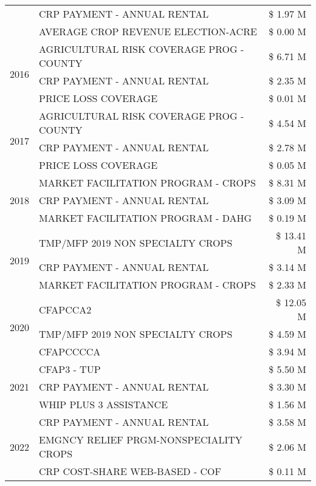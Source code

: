 \begin{tabular}{llr}
 & CRP PAYMENT - ANNUAL RENTAL & \$ 1.97 M \\
 & AVERAGE CROP REVENUE ELECTION-ACRE & \$ 0.00 M \\
\cline{1-3}
\multirow[t]{3}{*}{2016} & AGRICULTURAL RISK COVERAGE PROG - COUNTY & \$ 6.71 M \\
 & CRP PAYMENT - ANNUAL RENTAL & \$ 2.35 M \\
 & PRICE LOSS COVERAGE & \$ 0.01 M \\
\cline{1-3}
\multirow[t]{3}{*}{2017} & AGRICULTURAL RISK COVERAGE PROG - COUNTY & \$ 4.54 M \\
 & CRP PAYMENT - ANNUAL RENTAL & \$ 2.78 M \\
 & PRICE LOSS COVERAGE & \$ 0.05 M \\
\cline{1-3}
\multirow[t]{3}{*}{2018} & MARKET FACILITATION PROGRAM - CROPS & \$ 8.31 M \\
 & CRP PAYMENT - ANNUAL RENTAL & \$ 3.09 M \\
 & MARKET FACILITATION PROGRAM - DAHG & \$ 0.19 M \\
\cline{1-3}
\multirow[t]{3}{*}{2019} & TMP/MFP 2019 NON SPECIALTY CROPS & \$ 13.41 M \\
 & CRP PAYMENT - ANNUAL RENTAL & \$ 3.14 M \\
 & MARKET FACILITATION PROGRAM - CROPS & \$ 2.33 M \\
\cline{1-3}
\multirow[t]{3}{*}{2020} & CFAPCCA2 & \$ 12.05 M \\
 & TMP/MFP 2019 NON SPECIALTY CROPS & \$ 4.59 M \\
 & CFAPCCCCA & \$ 3.94 M \\
\cline{1-3}
\multirow[t]{3}{*}{2021} & CFAP3 - TUP & \$ 5.50 M \\
 & CRP PAYMENT - ANNUAL RENTAL & \$ 3.30 M \\
 & WHIP PLUS 3 ASSISTANCE & \$ 1.56 M \\
\cline{1-3}
\multirow[t]{3}{*}{2022} & CRP PAYMENT - ANNUAL RENTAL & \$ 3.58 M \\
 & EMGNCY RELIEF PRGM-NONSPECIALITY CROPS & \$ 2.06 M \\
 & CRP COST-SHARE WEB-BASED - COF & \$ 0.11 M \\
\cline{1-3}
\bottomrule
\end{tabular}
